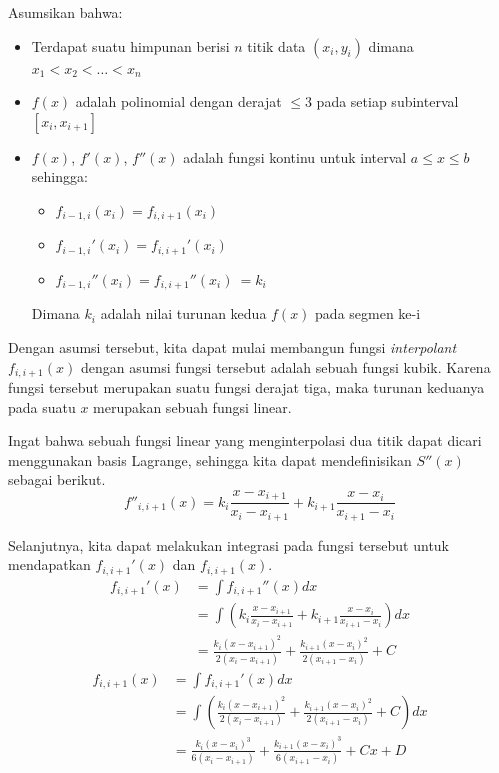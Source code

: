 \documentclass[journal,12pt,onecolumn,a4paper]{IEEEtran}
\begin{document}
Asumsikan bahwa:
\begin{itemize}
	\item Terdapat suatu himpunan berisi \(n\) titik data \((x_i, y_i)\) dimana \(x_1 < x_2 < \dots < x_n\)
	\item \(f(x)\) adalah polinomial dengan derajat \(\leq 3\) pada setiap subinterval \([x_i, x_{i + 1}]\)
	\item \(f(x)\), \(f'(x)\), \(f''(x)\) adalah fungsi kontinu untuk interval \(a \leq x \leq b\) sehingga:
	      \begin{itemize}
		      \item \(f_{i-1,i}(x_i) = f_{i, i+1}(x_i)\)
		      \item \(f_{i-1,i}'(x_i) = f_{i, i+1}'(x_i)\)
		      \item \(f_{i-1,i}''(x_i) = f_{i, i+1}''(x_i)\ = k_i\)
	      \end{itemize}
	      Dimana \(k_i\) adalah nilai turunan kedua \(f(x)\) pada segmen ke-i
\end{itemize}

Dengan asumsi tersebut, kita dapat mulai membangun fungsi \emph{interpolant} \(f_{i, i+1}(x)\) dengan asumsi fungsi tersebut adalah sebuah fungsi kubik. Karena fungsi tersebut merupakan suatu fungsi derajat tiga, maka turunan keduanya pada suatu \(x\) merupakan sebuah fungsi linear.

Ingat bahwa sebuah fungsi linear yang menginterpolasi dua titik dapat dicari menggunakan basis Lagrange, sehingga kita dapat mendefinisikan \(S''(x)\) sebagai berikut.
\begin{equation}
	f''_{i, i+1}(x) = k_i\frac{x-x_{i + 1}}{x_i - x_{i + 1}} + k_{i+1}\frac{x - x_i}{x_{i + 1} - x_i}
\end{equation}

Selanjutnya, kita dapat melakukan integrasi pada fungsi tersebut untuk mendapatkan \(f_{i, i+1}'(x)\) dan \(f_{i, i+1}(x)\).
\begin{equation}
	\begin{split}
		f_{i, i+1}'(x) & = \int f_{i, i+1}''(x) dx\\
		& = \int (k_i\frac{x-x_{i + 1}}{x_i - x_{i + 1}} + k_{i+1}\frac{x - x_i}{x_{i + 1} - x_i})dx\\
		& = \frac{k_i(x-x_{i+1})^2}{2(x_i-x_{i+1})} + \frac{k_{i+1}(x-x_{i})^2}{2(x_{i+1}-x_{i})} + C
	\end{split}
\end{equation}
\begin{equation}
	\begin{split}
		f_{i, i+1}(x) & = \int f_{i, i+1}'(x) dx\\
		& = \int (\frac{k_i(x-x_{i+1})^2}{2(x_i-x_{i+1})} + \frac{k_{i+1}(x-x_{i})^2}{2(x_{i+1}-x_{i})} + C)dx\\
		& = \frac{k_i(x-x_i)^3}{6(x_i - x_{i+1})} + \frac{k_{i+1}(x - x_i)^3}{6(x_{i+1} - x_i)} + Cx + D
	\end{split}
\end{equation}
\end{document}
